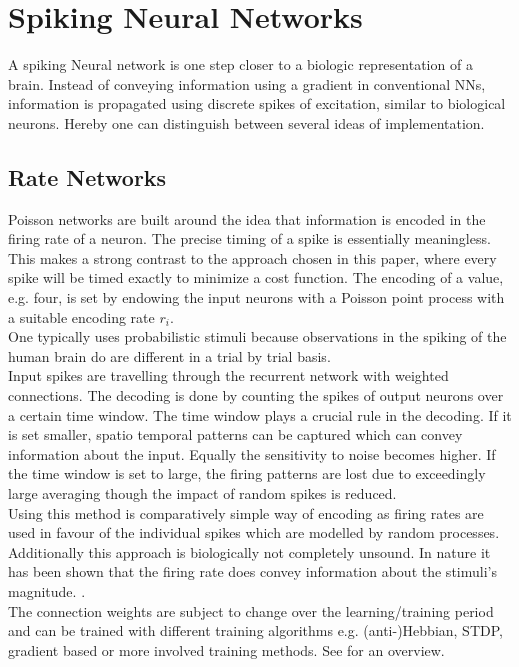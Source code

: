 \section{Spiking Neural Networks}
A spiking Neural network is one step closer to a biologic representation of a brain. Instead of conveying information using a gradient in conventional \ac{NN}s, information is propagated using discrete spikes of excitation, similar to biological neurons. Hereby one can distinguish between several ideas of implementation.
\subsection{Rate Networks}
Poisson networks are built around the idea that information is encoded in the firing rate of a neuron. The precise timing of a spike is essentially meaningless\cite{brette_philosophy_2015}. This makes a strong contrast to the approach chosen in this paper, where every spike will be timed exactly to minimize a cost function.
The encoding of a value, e.g. four, is set by endowing the input neurons with a Poisson point process with a suitable encoding rate $r_i$\cite{deneve_efficient_2016}.\\
One typically uses probabilistic stimuli because observations in the spiking of the human brain do are different in a trial by trial basis.\\
Input spikes are travelling through the recurrent network with weighted connections. The decoding is done by counting the spikes of output neurons over a certain time window. The time window plays a crucial rule in the decoding. If it is set smaller, spatio temporal patterns can be captured which can convey information about the input. Equally the sensitivity to noise becomes higher. If the time window is set to large, the firing patterns are lost due to exceedingly large averaging though the impact of random spikes is reduced.\\
Using this method is comparatively simple way of encoding as firing rates are used in favour of the individual spikes which are modelled by random processes. Additionally this approach is biologically not completely unsound. In nature it has been shown that the firing rate does convey information about the stimuli's magnitude. \cite{adrian_impulses_1926}.\\
The connection weights are subject to change over the learning/training period\cite{almomani_comparative_2019} and can be trained with different training algorithms e.g. (anti-)Hebbian, STDP, gradient based or more involved training methods\cite{demin_recurrent_2018}. See \cite{yi_learning_2023} for an overview.\\


